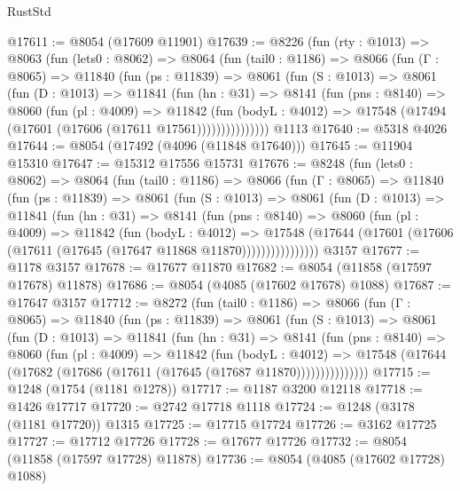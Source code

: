 \begin{lexlean}{RustStd}
\begin{coremodule}
@17611 := @8054 (@17609 @11901)
@17639 := @8226
    (fun (rty : @1013) =>
    @8063
      (fun (lets0 : @8062) =>
      @8064
        (fun (tail0 : @1186) =>
        @8066
          (fun (Γ : @8065) =>
          @11840
            (fun (ps : @11839) =>
            @8061
              (fun (S : @1013) =>
              @8061
                (fun (D : @1013) =>
                @11841
                  (fun (hn : @31) =>
                  @8141
                    (fun (pns : @8140) =>
                    @8060
                      (fun (pl : @4009) =>
                      @11842
                        (fun (bodyL : @4012) =>
                        @17548 (@17494 (@17601 (@17606 (@17611 @17561)))))))))))))))
    @1113
@17640 := @5318 @4026
@17644 := @8054 (@17492 (@4096 (@11848 @17640)))
@17645 := @11904 @15310
@17647 := @15312 @17556 @15731
@17676 := @8248
    (fun (lets0 : @8062) =>
    @8064
      (fun (tail0 : @1186) =>
      @8066
        (fun (Γ : @8065) =>
        @11840
          (fun (ps : @11839) =>
          @8061
            (fun (S : @1013) =>
            @8061
              (fun (D : @1013) =>
              @11841
                (fun (hn : @31) =>
                @8141
                  (fun (pns : @8140) =>
                  @8060
                    (fun (pl : @4009) =>
                    @11842
                      (fun (bodyL : @4012) =>
                      @17548
                        (@17644
                          (@17601 (@17606 (@17611 (@17645 (@17647 @11868 @11870))))))))))))))))
    @3157
@17677 := @1178 @3157
@17678 := @17677 @11870
@17682 := @8054 (@11858 (@17597 @17678) @11878)
@17686 := @8054 (@4085 (@17602 @17678) @1088)
@17687 := @17647 @3157
@17712 := @8272
    (fun (tail0 : @1186) =>
    @8066
      (fun (Γ : @8065) =>
      @11840
        (fun (ps : @11839) =>
        @8061
          (fun (S : @1013) =>
          @8061
            (fun (D : @1013) =>
            @11841
              (fun (hn : @31) =>
              @8141
                (fun (pns : @8140) =>
                @8060
                  (fun (pl : @4009) =>
                  @11842
                    (fun (bodyL : @4012) =>
                    @17548 (@17644 (@17682 (@17686 (@17611 (@17645 (@17687 @11870)))))))))))))))
@17715 := @1248 (@1754 (@1181 @1278))
@17717 := @1187 @3200 @12118
@17718 := @1426 @17717
@17720 := @2742 @17718 @1118
@17724 := @1248 (@3178 (@1181 @17720)) @1315
@17725 := @17715 @17724
@17726 := @3162 @17725
@17727 := @17712 @17726
@17728 := @17677 @17726
@17732 := @8054 (@11858 (@17597 @17728) @11878)
@17736 := @8054 (@4085 (@17602 @17728) @1088)

\end{coremodule}
\end{lexlean}

